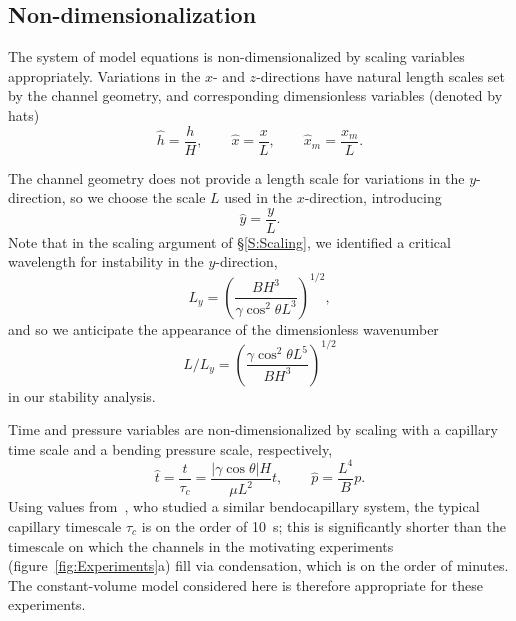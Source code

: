 \documentclass{jfm}
\begin{document}
\subsection{Non-dimensionalization}\label{S:Modelling:NonDim}
The system of model equations is non-dimensionalized by scaling variables appropriately. Variations in the $x$- and $z$-directions have natural length scales set by the channel geometry, and corresponding dimensionless variables (denoted by hats)
\begin{equation}\label{E:Modelling:NonDim:SpatialScaling}
\hat{h} = \frac{h}{H}, \qquad \hat{x} = \frac{x}{L}, \qquad \hat{x}_m = \frac{x_m}{L}.
\end{equation}

The channel geometry does not provide a length scale for variations in the $y$-direction, so we choose the scale $L$ used in the $x$-direction, introducing
\begin{equation}\label{E:Modelling:NonDim:yscaling}
\hat{y} = \frac{y}{L}.
\end{equation}
Note that in the scaling argument of \S\ref{S:Scaling}, we identified a critical wavelength for instability in the $y$-direction,
\begin{equation}\label{E:Modelling:NonDim:LengthscaleFromScaling}
L_y = \left(\frac{B H^3}{\gamma  \cos^2 \theta L^3}\right)^{1/2},
\end{equation}
and so we anticipate the appearance of the dimensionless wavenumber
\begin{equation}\label{E:Modelling:NonDim:ExpectedWavenumber}
L/L_y =  \left(\frac{\gamma \cos^2 \theta L^5}{B H^3}\right)^{1/2}
\end{equation}
in our stability analysis.

Time and pressure variables are non-dimensionalized by scaling with a capillary time scale and a bending pressure scale, respectively,
\begin{equation}\label{E:Modelling:NonDim:TimeAndPressureScaling}
\hat{t} =\frac{t}{ \tau_c} =  \frac{|\gamma \cos \theta| H}{\mu L^2}t, \qquad \hat{p} = \frac{L^4}{B}p.
\end{equation}
Using values from~\citet{Bradley2019PRL}, who studied a similar bendocapillary system, the typical capillary timescale $\tau_c$ is on the order of 10~s; this is significantly shorter than the timescale on which the channels in the motivating experiments (figure~\ref{fig:Experiments}a) fill via condensation, which is on the order of minutes. The constant-volume model considered here is therefore appropriate for these experiments.
\end{document}

